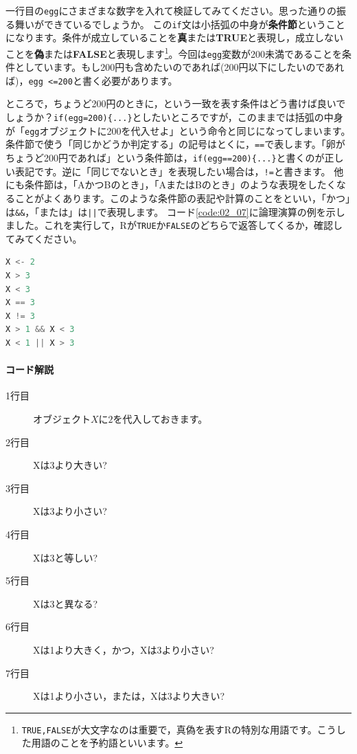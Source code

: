 \documentclass{ltjsbook}
\begin{document}
一行目の\verb|egg|にさまざまな数字を入れて検証してみてください。思った通りの振る舞いができているでしょうか。
この\texttt{if}文は小括弧の中身が\textbf{条件節}ということになります。条件が成立していることを\textbf{真}または\textbf{TRUE}と表現し，成立しないことを\textbf{偽}または\textbf{FALSE}と表現します\footnote{\texttt{TRUE,FALSE}が大文字なのは重要で，真偽を表すRの特別な用語です。こうした用語のことを予約語といいます。}。今回は\verb|egg|変数が200未満であることを条件としています。もし200円も含めたいのであれば(200円以下にしたいのであれば)，\verb|egg <=200|と書く必要があります。

ところで，ちょうど200円のときに，という一致を表す条件はどう書けば良いでしょうか？\verb|if(egg=200){...}|としたいところですが，このままでは括弧の中身が「\verb|egg|オブジェクトに200を代入せよ」という命令と同じになってしまいます。
条件節で使う「同じかどうか判定する」の記号はとくに，\verb|==|で表します。「卵がちょうど200円であれば」という条件節は，\verb|if(egg==200){...}|と書くのが正しい表記です。逆に「同じでないとき」を表現したい場合は，\verb|!=|と書きます。
他にも条件節は，「AかつBのとき」，「AまたはBのとき」のような表現をしたくなることがよくあります。このような条件節の表記や計算のことをといい，「かつ」は\verb|&&|，「または」は\texttt{||}で表現します。
コード\ref{code:02_07}に論理演算の例を示しました。これを実行して，Rが\verb|TRUE|か\verb|FALSE|のどちらで返答してくるか，確認してみてください。

\begin{lstlisting}[language=c++,label={code:02_07},caption={論理演算}]
X <- 2
X > 3
X < 3
X == 3
X != 3
X > 1 && X < 3
X < 1 || X > 3
\end{lstlisting}
\paragraph{コード解説}
\begin{description}
	\item[1行目] オブジェクト$X$に$2$を代入しておきます。
	\item[2行目] Xは3より大きい?
	\item[3行目] Xは3より小さい?
	\item[4行目] Xは3と等しい?
	\item[5行目] Xは3と異なる?
	\item[6行目] Xは1より大きく，かつ，Xは3より小さい?
	\item[7行目] Xは1より小さい，または，Xは3より大きい?
\end{description}
\end{document}
